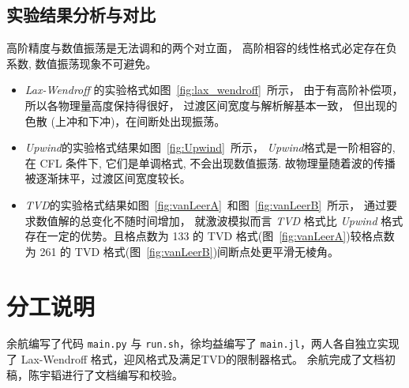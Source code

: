\documentclass[10.5pt
]{article}
\begin{document}
\subsection{实验结果分析与对比}



高阶精度与数值振荡是无法调和的两个对立面，
高阶相容的线性格式必定存在负系数, 数值振荡现象不可避免。

\begin{itemize}
	\item
\textit{Lax-Wendroff} 的实验格式如图~\ref{fig:lax_wendroff}~所示，
由于有高阶补偿项，
所以各物理量高度保持得很好，
过渡区间宽度与解析解基本一致，
但出现的色散 (上冲和下冲)，在间断处出现振荡。

\item
\textit{Upwind}的实验格式结果如图~\ref{fig:Upwind}~所示，
\textit{Upwind}格式是一阶相容的, 在 CFL 条件下, 它们是单调格式, 不会出现数值振荡.
故物理量随着波的传播被逐渐抹平，过渡区间宽度较长。

\item
\textit{TVD}的实验格式结果如图~\ref{fig:vanLeerA}~和图~\ref{fig:vanLeerB}~所示，
通过要求数值解的总变化不随时间增加，
就激波模拟而言 \textit{TVD} 格式比 \textit{Upwind} 格式存在一定的优势。且格点数为 133 的 TVD 格式(图~\ref{fig:vanLeerA})较格点数为 261 的 TVD 格式(图~\ref{fig:vanLeerB})间断点处更平滑无棱角。

\end{itemize}
\section{分工说明}
余航编写了代码 \verb|main.py| 与 \verb|run.sh|，徐均益编写了 \verb|main.jl|，两人各自独立实现了 Lax-Wendroff 格式，迎风格式及满足TVD的限制器格式。
余航完成了文档初稿，陈宇韬进行了文档编写和校验。
\end{document}
